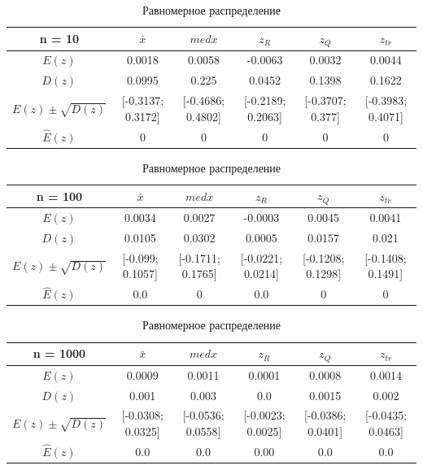 \documentclass[12pt]{article}
\begin{document}
\begin{center}
\begin{table}
\end{table}

\begin{table}
\caption{Равномерное распределение}
\begin{adjustbox}{width=\textwidth}
\begin{tabular}{| c | c | c | c | c | c |}
\hline
n = 10 & $\bar{x}$ & $med x$ & $z_R$ & $z_Q$ & $z_{tr}$ \\\hline
$E(z)$ & 0.0018 & 0.0058 & -0.0063 & 0.0032 & 0.0044 \\\hline
$D(z)$ & 0.0995 & 0.225 & 0.0452 & 0.1398 & 0.1622 \\\hline
$E(z) \pm \sqrt{D(z)}$ & [-0.3137; 0.3172] & [-0.4686; 0.4802] & [-0.2189; 0.2063] & [-0.3707; 0.377] & [-0.3983; 0.4071]\\\hline
$\hat{E}(z)$ & $ 0 $ & $ 0 $ & $0$ & $0$ & $0$ \\\hline
\end{tabular}
\end{adjustbox}

\begin{adjustbox}{width=\textwidth}
\begin{tabular}{| c | c | c | c | c | c |}
\hline
n = 100 & $\bar{x}$ & $med x$ & $z_R$ & $z_Q$ & $z_{tr}$ \\\hline
$E(z)$ & 0.0034 & 0.0027 & -0.0003 & 0.0045 & 0.0041 \\\hline
$D(z)$ & 0.0105 & 0.0302 & 0.0005 & 0.0157 & 0.021 \\\hline
$E(z) \pm \sqrt{D(z)}$ & [-0.099; 0.1057] & [-0.1711; 0.1765] & [-0.0221; 0.0214] & [-0.1208; 0.1298] & [-0.1408; 0.1491]\\\hline
$\hat{E}(z)$ & $ 0.0 $ & $ 0 $ & $0.0$ & $0$ & $0$ \\\hline
\end{tabular}
\end{adjustbox}

\begin{adjustbox}{width=\textwidth}
\begin{tabular}{| c | c | c | c | c | c |}
\hline
n = 1000 & $\bar{x}$ & $med x$ & $z_R$ & $z_Q$ & $z_{tr}$ \\\hline
$E(z)$ & 0.0009 & 0.0011 & 0.0001 & 0.0008 & 0.0014 \\\hline
$D(z)$ & 0.001 & 0.003 & 0.0 & 0.0015 & 0.002 \\\hline
$E(z) \pm \sqrt{D(z)}$ & [-0.0308; 0.0325] & [-0.0536; 0.0558] & [-0.0023; 0.0025] & [-0.0386; 0.0401] & [-0.0435; 0.0463]\\\hline
$\hat{E}(z)$ & $ 0.0 $ & $ 0.0 $ & $0.00$ & $0.0$ & $0.0$ \\\hline
\end{tabular}
\end{adjustbox}

\end{table}
\end{center}
\end{document}
